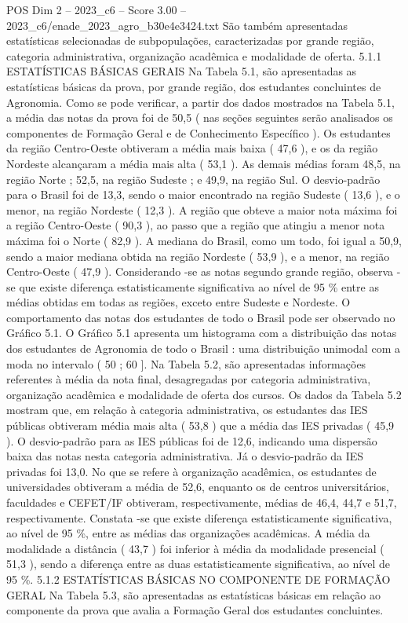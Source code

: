 \begin{textsample}{POS Dim 2 – 2023\_c6 – Score 3.00 – 2023\_c6/enade\_2023\_agro\_b30e4e3424.txt}
São também apresentadas estatísticas selecionadas de subpopulações, caracterizadas por grande região, categoria administrativa, organização acadêmica e modalidade de oferta. 5.1.1 ESTATÍSTICAS BÁSICAS GERAIS Na Tabela 5.1, são apresentadas as estatísticas básicas da prova, por grande região, dos estudantes concluintes de Agronomia.
Como se pode verificar, a partir dos dados mostrados na Tabela 5.1, a média das notas da prova foi de 50,5 ( nas seções seguintes serão analisados os componentes de Formação Geral e de Conhecimento Específico ).
Os estudantes da região Centro-Oeste obtiveram a média mais baixa ( 47,6 ), e os da região Nordeste alcançaram a média mais alta ( 53,1 ).
As demais médias foram 48,5, na região Norte ; 52,5, na região Sudeste ; e 49,9, na região Sul.
O desvio-padrão para o Brasil foi de 13,3, sendo o maior encontrado na região Sudeste ( 13,6 ), e o menor, na região Nordeste ( 12,3 ).
A região que obteve a maior nota máxima foi a região Centro-Oeste ( 90,3 ), ao passo que a região que atingiu a menor nota máxima foi o Norte ( 82,9 ).
A mediana do Brasil, como um todo, foi igual a 50,9, sendo a maior mediana obtida na região Nordeste ( 53,9 ), e a menor, na região Centro-Oeste ( 47,9 ).
Considerando -se as notas segundo grande região, observa -se que existe diferença estatisticamente significativa ao nível de 95 \% entre as médias obtidas em todas as regiões, exceto entre Sudeste e Nordeste.
O comportamento das notas dos estudantes de todo o Brasil pode ser observado no Gráfico 5.1.
O Gráfico 5.1 apresenta um histograma com a distribuição das notas dos estudantes de Agronomia de todo o Brasil : uma distribuição unimodal com a moda no intervalo ( 50 ; 60 ].
Na Tabela 5.2, são apresentadas informações referentes à média da nota final, desagregadas por categoria administrativa, organização acadêmica e modalidade de oferta dos cursos.
Os dados da Tabela 5.2 mostram que, em relação à categoria administrativa, os estudantes das IES públicas obtiveram média mais alta ( 53,8 ) que a média das IES privadas ( 45,9 ).
O desvio-padrão para as IES públicas foi de 12,6, indicando uma dispersão baixa das notas nesta categoria administrativa.
Já o desvio-padrão da IES privadas foi 13,0.
No que se refere à organização acadêmica, os estudantes de universidades obtiveram a média de 52,6, enquanto os de centros universitários, faculdades e CEFET/IF obtiveram, respectivamente, médias de 46,4, 44,7 e 51,7, respectivamente.
Constata -se que existe diferença estatisticamente significativa, ao nível de 95 \%, entre as médias das organizações acadêmicas.
A média da modalidade a distância ( 43,7 ) foi inferior à média da modalidade presencial ( 51,3 ), sendo a diferença entre as duas estatisticamente significativa, ao nível de 95 \%. 5.1.2 ESTATÍSTICAS BÁSICAS NO COMPONENTE DE FORMAÇÃO GERAL Na Tabela 5.3, são apresentadas as estatísticas básicas em relação ao componente da prova que avalia a Formação Geral dos estudantes concluintes.

\end{textsample}
